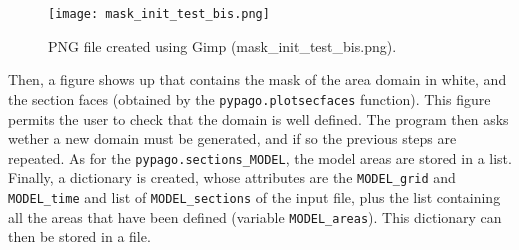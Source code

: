 \begin{figure}[h!]
\centering
\texttt{[image: mask\_init\_test\_bis.png]}
\caption{PNG file created using Gimp (mask\_init\_test\_bis.png).}
\label{fig:areas_model_2}
\end{figure}

Then, a figure shows up that contains the mask of the area domain in
white, and the section faces (obtained by the \verb+pypago.plotsecfaces+
function). This figure permits the user to check that the domain is
well defined. The program then asks wether a new domain must be
generated, and if so the previous steps are repeated. As for the
\verb+pypago.sections_MODEL+, the model areas are stored in a list.\\

Finally, a dictionary is created, whose attributes are the \verb+MODEL_grid+
and \verb+MODEL_time+ and list of \verb+MODEL_sections+ of the input
file, plus the list containing all the areas that have been defined
(variable \verb+MODEL_areas+). This dictionary can then be stored in a file.

